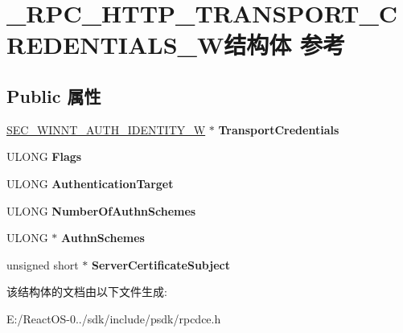 \hypertarget{struct___r_p_c___h_t_t_p___t_r_a_n_s_p_o_r_t___c_r_e_d_e_n_t_i_a_l_s___w}{}\section{\+\_\+\+R\+P\+C\+\_\+\+H\+T\+T\+P\+\_\+\+T\+R\+A\+N\+S\+P\+O\+R\+T\+\_\+\+C\+R\+E\+D\+E\+N\+T\+I\+A\+L\+S\+\_\+\+W结构体 参考}
\label{struct___r_p_c___h_t_t_p___t_r_a_n_s_p_o_r_t___c_r_e_d_e_n_t_i_a_l_s___w}
\subsection*{Public 属性}
\begin{DoxyCompactItemize}
\item 
\mbox{\label{struct___r_p_c___h_t_t_p___t_r_a_n_s_p_o_r_t___c_r_e_d_e_n_t_i_a_l_s___w_a7925a9d16ba6fd2baf0299eac69c4eb7}} 
\hyperlink{struct___s_e_c___w_i_n_n_t___a_u_t_h___i_d_e_n_t_i_t_y___w}{S\+E\+C\+\_\+\+W\+I\+N\+N\+T\+\_\+\+A\+U\+T\+H\+\_\+\+I\+D\+E\+N\+T\+I\+T\+Y\+\_\+W} $\ast$ {\bfseries Transport\+Credentials}
\item 
\mbox{\label{struct___r_p_c___h_t_t_p___t_r_a_n_s_p_o_r_t___c_r_e_d_e_n_t_i_a_l_s___w_a6c0894aa65b4c9d3e144ce760c5976df}} 
U\+L\+O\+NG {\bfseries Flags}
\item 
\mbox{\label{struct___r_p_c___h_t_t_p___t_r_a_n_s_p_o_r_t___c_r_e_d_e_n_t_i_a_l_s___w_a70aab392dd6d2996be9cf614fbfc1e79}} 
U\+L\+O\+NG {\bfseries Authentication\+Target}
\item 
\mbox{\label{struct___r_p_c___h_t_t_p___t_r_a_n_s_p_o_r_t___c_r_e_d_e_n_t_i_a_l_s___w_a209bea4180760592677316158eb8ca82}} 
U\+L\+O\+NG {\bfseries Number\+Of\+Authn\+Schemes}
\item 
\mbox{\label{struct___r_p_c___h_t_t_p___t_r_a_n_s_p_o_r_t___c_r_e_d_e_n_t_i_a_l_s___w_a2ac7ec699e78c08e83403d0be6551100}} 
U\+L\+O\+NG $\ast$ {\bfseries Authn\+Schemes}
\item 
\mbox{\label{struct___r_p_c___h_t_t_p___t_r_a_n_s_p_o_r_t___c_r_e_d_e_n_t_i_a_l_s___w_acba1e91d9ee85c3f2dec2b356a6a8cd1}} 
unsigned short $\ast$ {\bfseries Server\+Certificate\+Subject}
\end{DoxyCompactItemize}


该结构体的文档由以下文件生成\+:\begin{DoxyCompactItemize}
\item 
E\+:/\+React\+O\+S-\/0../sdk/include/psdk/rpcdce.\+h\end{DoxyCompactItemize}
